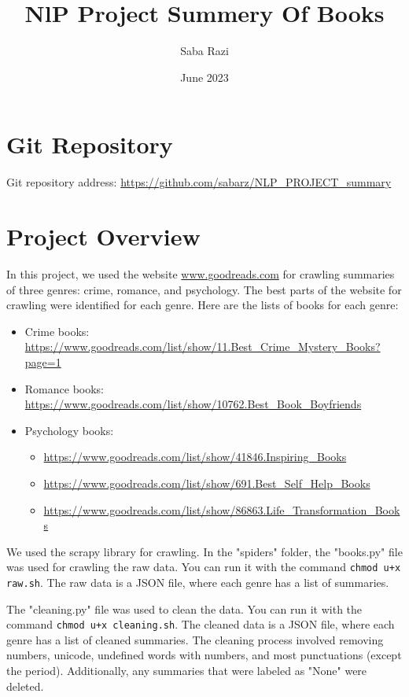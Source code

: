 \documentclass{article}
\title{NlP Project Summery Of Books}
\author{Saba Razi}
\date{June 2023}
\begin{document}
\maketitle

\section*{Git Repository}
Git repository address: \url{https://github.com/sabarz/NLP_PROJECT_summary}

\section*{Project Overview}
In this project, we used the website \url{www.goodreads.com} for crawling summaries of three genres: crime, romance, and psychology. The best parts of the website for crawling were identified for each genre. Here are the lists of books for each genre:

\begin{itemize}
  \item Crime books: \url{https://www.goodreads.com/list/show/11.Best_Crime_Mystery_Books?page=1}
  \item Romance books: \url{https://www.goodreads.com/list/show/10762.Best_Book_Boyfriends}
  \item Psychology books: 
    \begin{itemize}
      \item \url{https://www.goodreads.com/list/show/41846.Inspiring_Books}
      \item \url{https://www.goodreads.com/list/show/691.Best_Self_Help_Books}
      \item \url{https://www.goodreads.com/list/show/86863.Life_Transformation_Books}
    \end{itemize}
\end{itemize}

We used the scrapy library for crawling. In the "spiders" folder, the "books.py" file was used for crawling the raw data. You can run it with the command \texttt{chmod u+x raw.sh}. The raw data is a JSON file, where each genre has a list of summaries.

The "cleaning.py" file was used to clean the data. You can run it with the command \texttt{chmod u+x cleaning.sh}. The cleaned data is a JSON file, where each genre has a list of cleaned summaries. The cleaning process involved removing numbers, unicode, undefined words with numbers, and most punctuations (except the period). Additionally, any summaries that were labeled as "None" were deleted.
\end{document}
